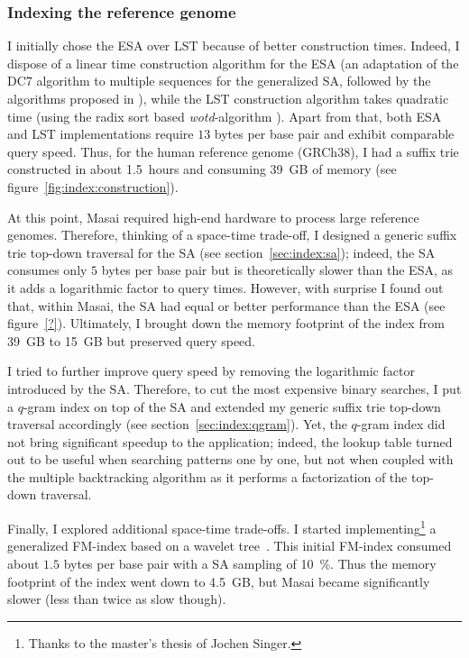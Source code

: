 \subsubsection{Indexing the reference genome}

I initially chose the ESA over LST because of better construction times.
Indeed, I dispose of a linear time construction algorithm for the ESA (an adaptation of the DC7 algorithm \citep{Dementiev2008} to multiple sequences \citep{Weese2013} for the generalized SA, followed by the algorithms proposed in \citep{Kasai2001,Abouelhoda2004}), while the LST construction algorithm takes quadratic time (using the radix sort based \emph{wotd}-algorithm \citep{Giegerich1999}).
Apart from that, both ESA and LST implementations require $13$ bytes per base pair and exhibit comparable query speed.
Thus, for the human reference genome (GRCh38), I had a suffix trie constructed in about 1.5~hours and consuming 39~GB of memory (see figure~\ref{fig:index:construction}).

At this point, Masai required high-end hardware to process large reference genomes.
Therefore, thinking of a space-time trade-off, I designed a generic suffix trie top-down traversal for the SA (see section~\ref{sec:index:sa});
indeed, the SA consumes only $5$ bytes per base pair but is theoretically slower than the ESA, as it adds a logarithmic factor to query times.
However, with surprise I found out that, within Masai, the SA had equal or better performance than the ESA (see figure~\ref{?}).
Ultimately, I brought down the memory footprint of the index from 39~GB to 15~GB but preserved query speed.

I tried to further improve query speed by removing the logarithmic factor introduced by the SA.
Therefore, to cut the most expensive binary searches, I put a $q$-gram index on top of the SA and extended my generic suffix trie top-down traversal accordingly (see section~\ref{sec:index:qgram}).
Yet, the $q$-gram index did not bring significant speedup to the application;
indeed, the lookup table turned out to be useful when searching patterns one by one, but not when coupled with the multiple backtracking algorithm as it performs a factorization of the top-down traversal.

Finally, I explored additional space-time trade-offs.
I started implementing\footnote{Thanks to the master's thesis of Jochen Singer.} a generalized FM-index based on a wavelet tree~\citep{Grossi2003}.
This initial FM-index consumed about $1.5$ bytes per base pair with a SA sampling of 10~\%.
Thus the memory footprint of the index went down to 4.5~GB, but Masai became significantly slower (less than twice as slow though).

